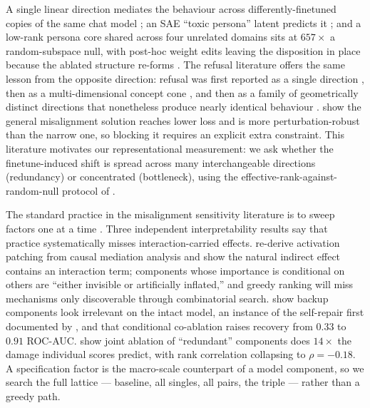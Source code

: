  A single linear direction mediates the behaviour across differently-finetuned copies of the same chat model \citep{soligo2026rank1}; an SAE ``toxic persona'' latent predicts it \citep{personas2025}; and a low-rank persona core shared across four unrelated domains sits at $657\times$ a random-subspace null, with post-hoc weight edits leaving the disposition in place because the ablated structure re-forms \citep{personacore2026}. The refusal literature offers the same lesson from the opposite direction: refusal was first reported as a single direction \citep{refusal2024}, then as a multi-dimensional concept cone \citep{cones2025}, and then as a family of geometrically distinct directions that nonetheless produce nearly identical behaviour \citep{morerefusal2026}. \citet{soligo2026easy} show the general misalignment solution reaches lower loss and is more perturbation-robust than the narrow one, so blocking it requires an explicit extra constraint. This literature motivates our representational measurement: we ask whether the finetune-induced shift is spread across many interchangeable directions (redundancy) or concentrated (bottleneck), using the effective-rank-against-random-null protocol of \citet{personacore2026}.

 The standard practice in the misalignment sensitivity literature is to sweep factors one at a time \citep{evilspectra2026,overtrained2026,whatshapes2026}. Three independent interpretability results say that practice systematically misses interaction-carried effects. \citet{mediators2026} re-derive activation patching from causal mediation analysis and show the natural indirect effect contains an interaction term; components whose importance is conditional on others are ``either invisible or artificially inflated,'' and greedy ranking will miss mechanisms only discoverable through combinatorial search. \citet{coax2026} show backup components look irrelevant on the intact model, an instance of the self-repair first documented by \citet{hydra2023}, and that conditional co-ablation raises recovery from $0.33$ to $0.91$ ROC-AUC. \citet{hiddenheroes2026} show joint ablation of ``redundant'' components does $14\times$ the damage individual scores predict, with rank correlation collapsing to $\rho=-0.18$. A specification factor is the macro-scale counterpart of a model component, so we search the full lattice --- baseline, all singles, all pairs, the triple --- rather than a greedy path.

